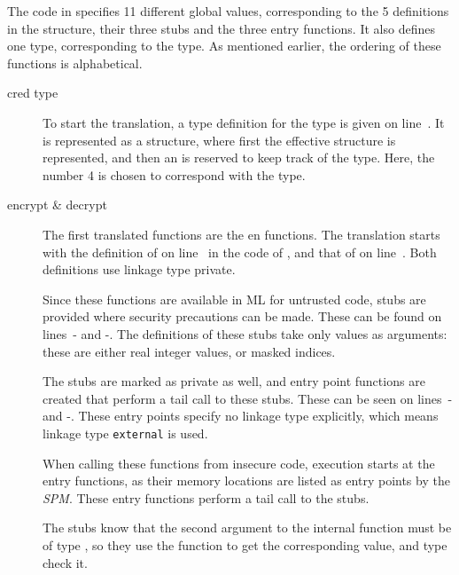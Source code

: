 The code in  specifies 11 different global values, corresponding to the 5 definitions in the  structure, their three stubs and the three entry functions. It also defines one type, corresponding to the  type.
As mentioned earlier, the ordering of these functions is alphabetical.
\begin{description}
\item[cred type] To start the translation, a type definition for the  type is given on line~.
It is represented as a structure, where first the effective structure is represented, and then an  is reserved to keep track of the type.
Here, the number 4 is chosen to correspond with the  type.

\item[encrypt \& decrypt] The first translated functions are the  en  functions. The translation starts with the definition of  on line~ in the code of , and that of  on line~.
Both definitions use linkage type private.

Since these functions are available in ML for untrusted code, stubs are provided where security precautions can be made. These can be found on lines~- and -.
The definitions of these stubs take only  values as arguments: these are either real integer values, or masked indices.

The stubs are marked as private as well, and entry point functions are created that perform a tail call to these stubs. These can be seen on lines~- and -.
These entry points specify no linkage type explicitly, which means linkage type \lstinline[language={[x86masm]Assembler}]{external}  is used.

When calling these functions from insecure code, execution starts at the entry functions, as their memory locations are listed as entry points by the \emph{SPM}.
These entry functions perform a tail call to the stubs.

The stubs know that the second argument to the internal function must be of type , so they use the  function to get the corresponding  value, and type check it.


\end{description}
